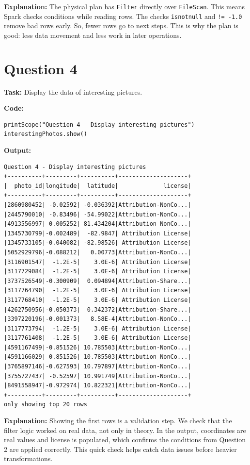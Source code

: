 \documentclass[11pt]{article}
\begin{document}
\textbf{Explanation:} The physical plan has \texttt{Filter} directly over \texttt{FileScan}. This means Spark checks conditions while reading rows. The checks \texttt{isnotnull} and \texttt{!= -1.0} remove bad rows early. So, fewer rows go to next steps. This is why the plan is good: less data movement and less work in later operations.

\section*{Question 4}
\textbf{Task:} Display the data of interesting pictures.

\textbf{Code:}
\begin{lstlisting}
printScope("Question 4 - Display interesting pictures")
interestingPhotos.show()
\end{lstlisting}

\textbf{Output:}
\begin{lstlisting}
Question 4 - Display interesting pictures
+----------+---------+----------+--------------------+
|  photo_id|longitude|  latitude|             license|
+----------+---------+----------+--------------------+
|2860980452| -0.02592| -0.036392|Attribution-NonCo...|
|2445790010| -0.83496| -54.99022|Attribution-NonCo...|
|4913556997|-0.005252|-81.434204|Attribution-NonCo...|
|1345730799|-0.002489|  -82.9847| Attribution License|
|1345733105|-0.040082| -82.98526| Attribution License|
|5052929796|-0.088212|   0.00773|Attribution-NonCo...|
|3116901547|  -1.2E-5|    3.0E-6| Attribution License|
|3117729084|  -1.2E-5|    3.0E-6| Attribution License|
|3737526549|-0.300909|  0.094894|Attribution-Share...|
|3117764790|  -1.2E-5|    3.0E-6| Attribution License|
|3117768410|  -1.2E-5|    3.0E-6| Attribution License|
|4262750956|-0.050373|  0.342372|Attribution-Share...|
|3397220196|-0.001373|   8.58E-4|Attribution-NonCo...|
|3117773794|  -1.2E-5|    3.0E-6| Attribution License|
|3117761408|  -1.2E-5|    3.0E-6| Attribution License|
|4591167499|-0.851526| 10.785503|Attribution-NonCo...|
|4591166029|-0.851526| 10.785503|Attribution-NonCo...|
|3765897146|-0.627593| 10.797897|Attribution-NonCo...|
|3755727437| -0.52597| 10.991749|Attribution-NonCo...|
|8491558947|-0.972974| 10.822321|Attribution-NonCo...|
+----------+---------+----------+--------------------+
only showing top 20 rows
\end{lstlisting}

\textbf{Explanation:} Showing the first rows is a validation step. We check that the filter logic worked on real data, not only in theory. In the output, coordinates are real values and license is populated, which confirms the conditions from Question 2 are applied correctly. This quick check helps catch data issues before heavier transformations.
\end{document}
